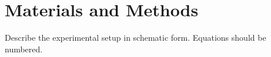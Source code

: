 
\section{Materials and Methods}
Describe the experimental setup in schematic form.
Equations should be numbered.